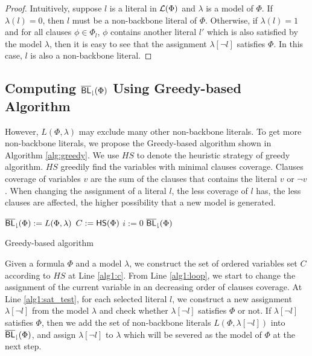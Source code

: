 \begin{proof}
Intuitively, suppose $l$ is a literal in $\Lit(\Phi)$ and $\lambda$ is a model of $\Phi$.
If $\lambda(l)=0$, then $l$ must be a non-backbone literal of $\Phi$.
Otherwise, if $\lambda(l)=1$ and for all clauses $\phi\in\Phi_l$, $\phi$ contains another literal $l'$ which is also satisfied by the model $\lambda$, then it is easy to see that
the assignment $\lambda[\neg l]$ satisfies $\Phi$.
In this case, $l$ is also a non-backbone literal.
\end{proof}

\medskip

\subsection{Computing ${\sf \overline{BL}_\downharpoonright}(\Phi)$ Using Greedy-based Algorithm}

However, $L(\Phi,\lambda)$ may exclude many other non-backbone literals.
To get more non-backbone literals, we propose the Greedy-based algorithm shown in Algorithm \ref{alg:greedy}. We use $HS$ to denote the heuristic strategy of greedy algorithm. $HS$ greedily find the variables with minimal clauses coverage. Clauses coverage of variables $v$ are the sum of the clauses that contains the literal $v$ or $\neg v$. When changing the assignment of a literal $l$, the less coverage of $l$ has, the less clauses are affected, the higher possibility that a new model is generated.

\newpage

\begin{algorithm2e}
\SetAlgoShortEnd
\SetFillComment
{}
${\sf \overline{BL}_\downharpoonright}(\Phi):=L(\Phi,\lambda)$\; \label{alg1:init}
$C:={\sf HS}(\Phi)$\; \label{alg1:c}
$i:=0$\;
\Return ${\sf \overline{BL}_\downharpoonright}(\Phi)$\;
\caption{Greedy-based algorithm}
\label{alg:greedy}
\end{algorithm2e}
Given a formula $\Phi$ and a model $\lambda$, we construct the set of ordered variables set $C$ according to $HS$ at Line \ref{alg1:c}. From Line \ref{alg1:loop}, we start to change the assignment of the current variable in an decreasing order of clauses coverage. At Line \ref{alg1:sat_test}, for each selected literal $l$, we construct a new assignment $\lambda[\neg l]$ from the model
$\lambda$ and check whether  $\lambda[\neg l]$ satisfies $\Phi$ or not. If $\lambda[\neg l]$ satisfies $\Phi$, then we add the set of non-backbone literals $L(\Phi,\lambda[\neg l])$ into ${\sf \overline{BL}_\downharpoonright}(\Phi)$, and
assign $\lambda[\neg l]$ to $\lambda$ which will be severed as the model of $\Phi$ at the next step.

